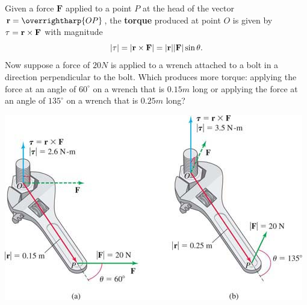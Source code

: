 \documentclass[mathNotesPreamble]{subfiles}
\begin{document}
    \begin{ex*}
      Given a force $\mathbf F$ applied to a point $P$ at the head of the vector $\vecr=\overrightharp{OP}$, the \textbf{torque} produced at point $O$ is given by $\mathbf \tau={\mathbf{r}}\times\mathbf F$ with magnitude
        \[{\left\vert\mathbf \tau\right\vert}={\left\vert{\mathbf{r}}\times\mathbf F\right\vert}={\left\vert{\mathbf{r}}\right\vert}{\left\vert\mathbf F\right\vert}\sin\theta.\]
      Now suppose a force of $20 N$ is applied to a wrench attached to a bolt in a direction perpendicular to the bolt. Which produces more torque: applying the force at an angle of $60^\circ$ on a wrench that is $0.15 m$ long or applying the force at an angle of $135^\circ$ on a wrench that is $0.25 m$ long? 
    \end{ex*}
    \begin{center}
      \includegraphics[width=0.75\linewidth]{images/briggs_13_04/fig13_63}
    \end{center}

  \pagebreak
  
\end{document}
